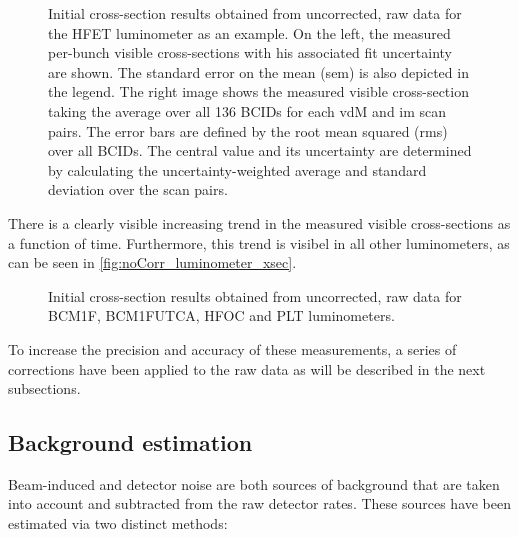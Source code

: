 \begin{figure}[!htb]
	\centering
	\caption{Initial cross-section results obtained from uncorrected, raw data for the HFET luminometer as an example. On the left, the measured per-bunch visible cross-sections with his associated fit uncertainty are shown. The standard error on the mean (sem) is also depicted in the legend. The right image shows the measured visible cross-section taking the average over all 136 BCIDs for each vdM and im scan pairs. The error bars are defined by the root mean squared (rms) over all BCIDs. The central value and its uncertainty are determined by calculating the uncertainty-weighted average and  standard deviation over the scan pairs.}
	\label{fig:no_Corr_xsec_results_HFET}
\end{figure}

There is a clearly visible increasing trend in the measured visible cross-sections as a function of time. Furthermore, this trend is visibel in all other luminometers, as can be seen in \autoref{fig:noCorr_luminometer_xsec}.

\begin{figure}[!htb]
	\centering
	\caption{Initial cross-section results obtained from uncorrected, raw data for BCM1F, BCM1FUTCA, HFOC and PLT luminometers.}
	\label{fig:noCorr_luminometer_xsec}
\end{figure}

To increase the precision and accuracy of these measurements, a series of corrections have been applied to the raw data as will be described in the next subsections.

\subsection{Background estimation}

Beam-induced and detector noise are both sources of background that are taken into account and subtracted from the raw detector rates. These sources have been estimated via two distinct methods:

